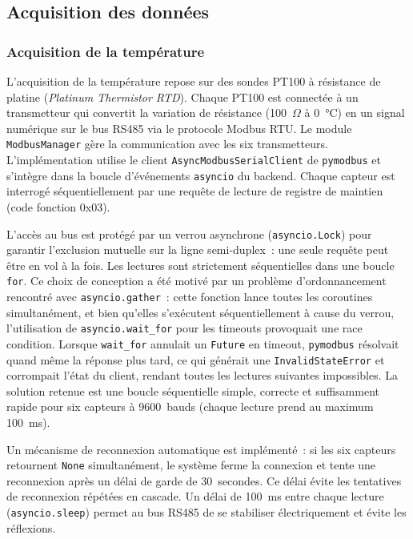 \subsection{Acquisition des données}

\subsubsection{Acquisition de la température}

L'acquisition de la température repose sur des sondes PT100 à résistance de platine (\emph{Platinum Thermistor RTD}). Chaque PT100 est connectée à un transmetteur qui convertit la variation de résistance (100~$\Omega$ à 0~\si{\celsius}) en un signal numérique sur le bus RS485 via le protocole Modbus RTU. Le module \texttt{ModbusManager} gère la communication avec les six transmetteurs. L'implémentation utilise le client \texttt{AsyncModbusSerialClient} de \texttt{pymodbus} et s'intègre dans la boucle d'événements \texttt{asyncio} du backend. Chaque capteur est interrogé séquentiellement par une requête de lecture de registre de maintien (code fonction 0x03).

L'accès au bus est protégé par un verrou asynchrone (\texttt{asyncio.Lock}) pour garantir l'exclusion mutuelle sur la ligne semi-duplex~: une seule requête peut être en vol à la fois. Les lectures sont strictement séquentielles dans une boucle \texttt{for}. Ce choix de conception a été motivé par un problème d'ordonnancement rencontré avec \texttt{asyncio.gather}~: cette fonction lance toutes les coroutines simultanément, et bien qu'elles s'exécutent séquentiellement à cause du verrou, l'utilisation de \texttt{asyncio.wait\_for} pour les timeouts provoquait une race condition. Lorsque \texttt{wait\_for} annulait un \texttt{Future} en timeout, \texttt{pymodbus} résolvait quand même la réponse plus tard, ce qui générait une \texttt{InvalidStateError} et corrompait l'état du client, rendant toutes les lectures suivantes impossibles. La solution retenue est une boucle séquentielle simple, correcte et suffisamment rapide pour six capteurs à 9600~bauds (chaque lecture prend au maximum 100~ms).

Un mécanisme de reconnexion automatique est implémenté~: si les six capteurs retournent \texttt{None} simultanément, le système ferme la connexion et tente une reconnexion après un délai de garde de 30~secondes. Ce délai évite les tentatives de reconnexion répétées en cascade. Un délai de 100~ms entre chaque lecture (\texttt{asyncio.sleep}) permet au bus RS485 de se stabiliser électriquement et évite les réflexions.

